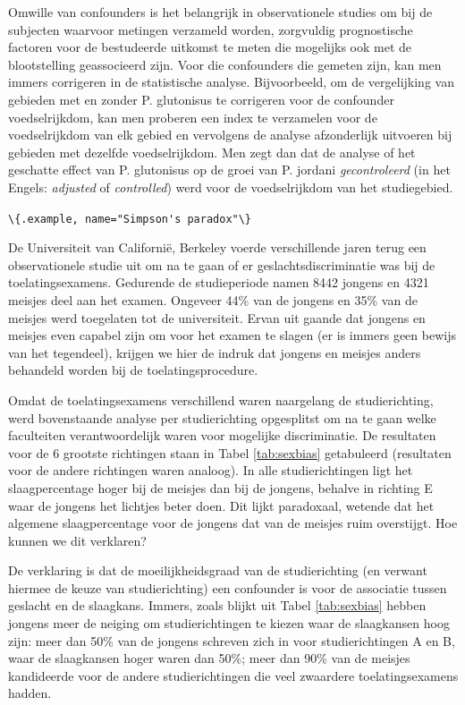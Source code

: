\documentclass[
  12pt,dutch,coursenotes]{book}
\newcommand{\passthrough}[1]{#1}
\begin{document}
Omwille van confounders is het belangrijk in observationele studies om bij
de subjecten waarvoor metingen verzameld worden, zorgvuldig prognostische factoren voor de bestudeerde uitkomst te meten die mogelijks ook met de blootstelling geassocieerd zijn.
Voor die confounders die gemeten zijn, kan men immers corrigeren in de
statistische analyse. Bijvoorbeeld, om de vergelijking van gebieden met en
zonder P. glutonisus te corrigeren voor de confounder voedselrijkdom, kan men proberen een index te verzamelen voor de voedselrijkdom van elk gebied en vervolgens de analyse
afzonderlijk uitvoeren bij gebieden met dezelfde voedselrijkdom.
Men zegt dan dat de analyse of het geschatte
effect van P. glutonisus op de groei van P. jordani \emph{gecontroleerd} (in het Engels:
\emph{adjusted} of \emph{controlled}) werd voor de voedselrijkdom van het studiegebied.

\passthrough{\lstinline!\{.example, name="Simpson's paradox"\}!}

De Universiteit van
Californië, Berkeley voerde verschillende jaren terug een observationele
studie uit om na te gaan of er geslachtsdiscriminatie was bij de
toelatingsexamens. Gedurende de studieperiode namen 8442 jongens en 4321
meisjes deel aan het examen. Ongeveer 44\% van de jongens en 35\% van de
meisjes werd toegelaten tot de universiteit. Ervan uit gaande dat jongens en
meisjes even capabel zijn om voor het examen te slagen (er is immers geen
bewijs van het tegendeel), krijgen we hier de indruk dat jongens en meisjes
anders behandeld worden bij de toelatingsprocedure.

Omdat de toelatingsexamens verschillend waren naargelang de studierichting,
werd bovenstaande analyse per studierichting opgesplitst om na te gaan welke
faculteiten verantwoordelijk waren voor mogelijke discriminatie. De
resultaten voor de 6 grootste richtingen staan in Tabel \ref{tab:sexbias}
getabuleerd (resultaten voor de andere richtingen waren analoog). In alle
studierichtingen ligt het slaagpercentage hoger bij de meisjes dan bij de
jongens, behalve in richting E waar de jongens het lichtjes beter doen. Dit
lijkt paradoxaal, wetende dat het algemene slaagpercentage voor de jongens
dat van de meisjes ruim overstijgt. Hoe kunnen we dit verklaren?

De verklaring is dat de moeilijkheidsgraad van de studierichting (en verwant
hiermee de keuze van studierichting) een confounder is voor de associatie
tussen geslacht en de slaagkans. Immers, zoals blijkt uit Tabel \ref{tab:sexbias} hebben jongens meer de neiging om studierichtingen te kiezen
waar de slaagkansen hoog zijn: meer dan 50\% van de jongens schreven zich in
voor studierichtingen A en B, waar de slaagkansen hoger waren dan 50\%; meer
dan 90\% van de meisjes kandideerde voor de andere studierichtingen die veel
zwaardere toelatingsexamens hadden.
\end{document}
